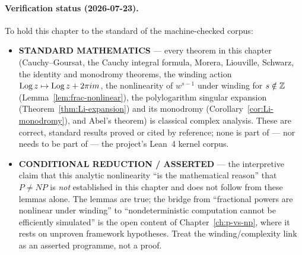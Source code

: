 \paragraph{Verification status (2026-07-23).}
To hold this chapter to the standard of the machine-checked corpus:
\begin{itemize}
\item \textbf{STANDARD MATHEMATICS} --- every theorem in this chapter (Cauchy--Goursat, the Cauchy integral formula, Morera, Liouville, Schwarz, the identity and monodromy theorems, the winding action $\operatorname{Log} z \mapsto \operatorname{Log} z + 2\pi i m$, the nonlinearity of $w^{s-1}$ under winding for $s\notin\mathbb{Z}$ (Lemma~\ref{lem:frac-nonlinear}), the polylogarithm singular expansion (Theorem~\ref{thm:Li-expansion}) and its monodromy (Corollary~\ref{cor:Li-monodromy}), and Abel's theorem) is classical complex analysis. These are correct, standard results proved or cited by reference; none is part of --- nor needs to be part of --- the project's Lean~4 kernel corpus.
\item \textbf{CONDITIONAL REDUCTION / ASSERTED} --- the interpretive claim that this analytic nonlinearity ``is the mathematical reason'' that $P\neq NP$ is \emph{not} established in this chapter and does not follow from these lemmas alone. The lemmas are true; the bridge from ``fractional powers are nonlinear under winding'' to ``nondeterministic computation cannot be efficiently simulated'' is the open content of Chapter~\ref{ch:p-vs-np}, where it rests on unproven framework hypotheses. Treat the winding/complexity link as an asserted programme, not a proof.
\end{itemize}

